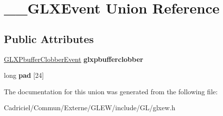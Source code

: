 \hypertarget{union_____g_l_x_event}{}\section{\+\_\+\+\_\+\+G\+L\+X\+Event Union Reference}
\label{union_____g_l_x_event}
\subsection*{Public Attributes}
\begin{DoxyCompactItemize}
\item 
\hyperlink{struct_g_l_x_pbuffer_clobber_event}{G\+L\+X\+Pbuffer\+Clobber\+Event} {\bfseries glxpbufferclobber}\hypertarget{union_____g_l_x_event_ada5880e2b424bcb2f60a411aaf713fae}{}\label{union_____g_l_x_event_ada5880e2b424bcb2f60a411aaf713fae}

\item 
long {\bfseries pad} \mbox{[}24\mbox{]}\hypertarget{union_____g_l_x_event_a1cb8f6e7e77a34d25baf43b3f3bc2d4f}{}\label{union_____g_l_x_event_a1cb8f6e7e77a34d25baf43b3f3bc2d4f}

\end{DoxyCompactItemize}


The documentation for this union was generated from the following file\+:\begin{DoxyCompactItemize}
\item 
Cadriciel/\+Commun/\+Externe/\+G\+L\+E\+W/include/\+G\+L/glxew.\+h\end{DoxyCompactItemize}

